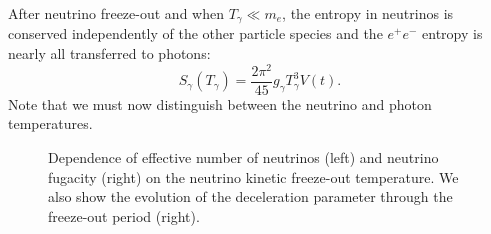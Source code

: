 After neutrino freeze-out and when $T_{\gamma}\ll m_e$, the entropy in neutrinos is conserved independently of the other particle species and the $e^+e^-$ entropy is nearly all transferred to photons:
\begin{equation}
S_{\gamma}(T_\gamma)=\frac{2 \pi^2}{45}g_\gamma T_{\gamma}^3 V(t).
\end{equation}
 Note that we must now distinguish between the neutrino and photon temperatures.

\begin{figure}\label{fig:Tk_dependence}
\begin{minipage}{\linewidth}
\caption{Dependence of  effective number of neutrinos (left) and neutrino fugacity (right) on the neutrino kinetic freeze-out temperature. We also show the evolution of the deceleration parameter through the freeze-out period (right).}
\end{minipage}
 \end{figure}



